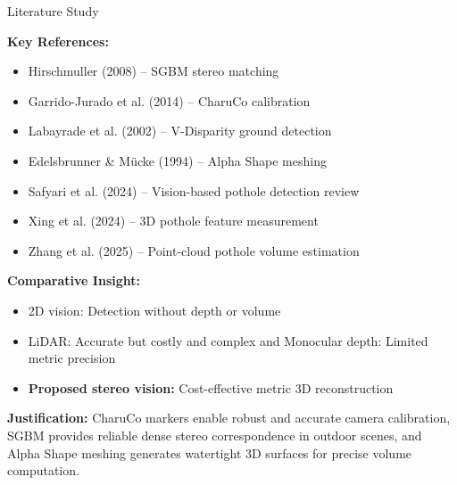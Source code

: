 \documentclass[aspectratio=169]{beamer}
\begin{document}
\begin{frame}{Literature Study}

\textbf{Key References:}
\begin{itemize}
\item Hirschmuller (2008) – SGBM stereo matching
\item Garrido-Jurado et al. (2014) – CharuCo calibration
\item Labayrade et al. (2002) – V-Disparity ground detection
\item Edelsbrunner \& M{\"u}cke (1994) – Alpha Shape meshing
\item Safyari et al. (2024) – Vision-based pothole detection review
\item Xing et al. (2024) – 3D pothole feature measurement
\item Zhang et al. (2025) – Point-cloud pothole volume estimation
\end{itemize}

\vspace{0.1cm}

\textbf{Comparative Insight:}
\begin{itemize}
\item 2D vision: Detection without depth or volume
\item LiDAR: Accurate but costly and complex and Monocular depth: Limited metric precision
\item \textbf{Proposed stereo vision:} Cost-effective metric 3D reconstruction
\end{itemize}

\vspace{0.1cm}

\textbf{Justification:} CharuCo markers enable robust and accurate camera calibration, SGBM provides reliable dense stereo correspondence in outdoor scenes, and Alpha Shape meshing generates watertight 3D surfaces for precise volume computation.

\end{frame}
\end{document}

